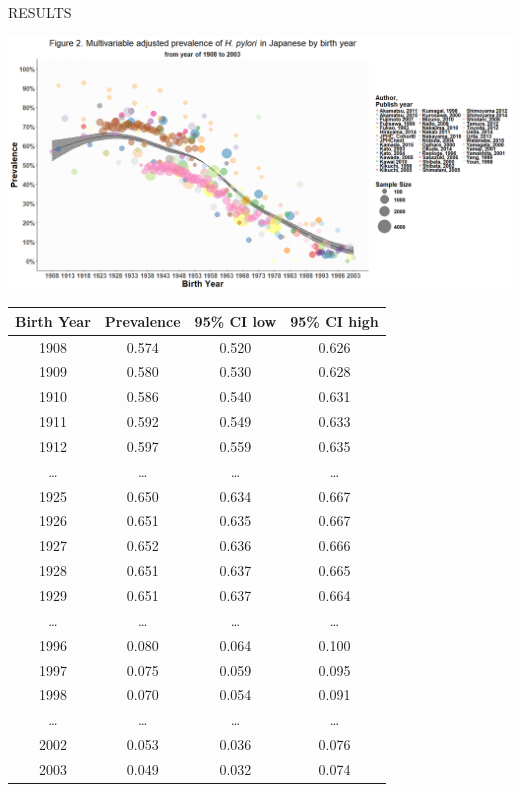 \documentclass[english,xcolor=table,t
]{beamer}
\begin{document}
\begin{frame}
\begin{columns}
\begin{block}{RESULTS}
{\centering\includegraphics[]{images/main.png}
\par}

\begin{table}[]
\centering
{}
\label{my-label}
\begin{tabular}{@{}cccc@{}}
\toprule
Birth Year & Prevalence & 95\% CI low & 95\% CI high \\ \midrule
1908 & 0.574 & 0.520 & 0.626 \\
1909 & 0.580 & 0.530 & 0.628 \\
1910 & 0.586 & 0.540 & 0.631 \\
1911 & 0.592 & 0.549 & 0.633 \\
1912 & 0.597 & 0.559 & 0.635 \\
\dots & \dots & \dots & \dots \\
1925 & 0.650 & 0.634 & 0.667 \\
1926 & 0.651 & 0.635 & 0.667 \\
\rowcolor[HTML]{F8FF00} 
1927 & 0.652 & 0.636 & 0.666 \\
1928 & 0.651 & 0.637 & 0.665 \\
1929 & 0.651 & 0.637 & 0.664 \\
\dots & \dots & \dots & \dots \\
\rowcolor[HTML]{F8FF00} 
1996 & 0.080 & 0.064 & 0.100 \\
1997 & 0.075 & 0.059 & 0.095 \\
1998 & 0.070 & 0.054 & 0.091 \\
\dots & \dots & \dots & \dots \\
2002 & 0.053 & 0.036 & 0.076 \\
2003 & 0.049 & 0.032 & 0.074 \\ \bottomrule
\end{tabular}
\end{table}


\end{block}
\end{columns}
\end{frame}
\end{document}
